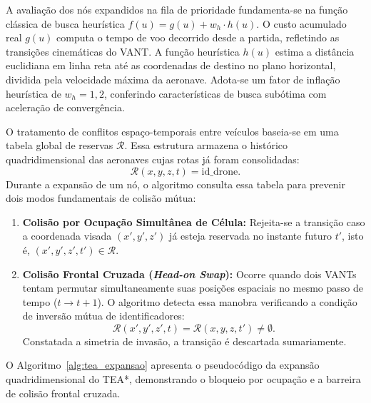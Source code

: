 A avaliação dos nós expandidos na fila de prioridade fundamenta-se na função clássica de busca heurística $f(u) = g(u) + w_h \cdot h(u)$. O custo acumulado real $g(u)$ computa o tempo de voo decorrido desde a partida, refletindo as transições cinemáticas do VANT. A função heurística $h(u)$ estima a distância euclidiana em linha reta até as coordenadas de destino no plano horizontal, dividida pela velocidade máxima da aeronave. Adota-se um fator de inflação heurística de $w_h = 1{,}2$, conferindo características de busca subótima com aceleração de convergência.

O tratamento de conflitos espaço-temporais entre veículos baseia-se em uma tabela global de reservas $\mathcal{R}$. Essa estrutura armazena o histórico quadridimensional das aeronaves cujas rotas já foram consolidadas:
\begin{equation}\label{eq:tabela_reservas}
\mathcal{R}(x, y, z, t) = \text{id\_drone}.
\end{equation}
Durante a expansão de um nó, o algoritmo consulta essa tabela para prevenir dois modos fundamentais de colisão mútua:
\begin{enumerate}
    \item \textbf{Colisão por Ocupação Simultânea de Célula:} Rejeita-se a transição caso a coordenada visada $(x', y', z')$ já esteja reservada no instante futuro $t'$, isto é, $(x', y', z', t') \in \mathcal{R}$.
    \item \textbf{Colisão Frontal Cruzada (\textit{Head-on Swap}):} Ocorre quando dois VANTs tentam permutar simultaneamente suas posições espaciais no mesmo passo de tempo ($t \to t+1$). O algoritmo detecta essa manobra verificando a condição de inversão mútua de identificadores:
    \begin{equation}\label{eq:anti_swap}
    \mathcal{R}(x', y', z', t) = \mathcal{R}(x, y, z, t') \neq \emptyset.
    \end{equation}
    Constatada a simetria de invasão, a transição é descartada sumariamente.
\end{enumerate}

O Algoritmo~\ref{alg:tea_expansao} apresenta o pseudocódigo da expansão quadridimensional do TEA*, demonstrando o bloqueio por ocupação e a barreira de colisão frontal cruzada.

